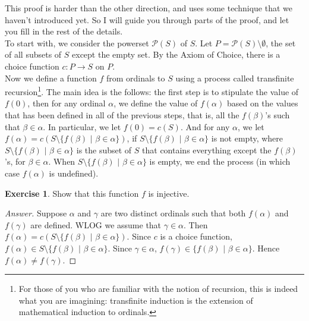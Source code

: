 \documentclass[11pt]{article}
\theoremstyle{definition}
\newtheorem{exer}{Exercise}
\begin{document}
\noindent
This proof is harder than the other direction, and uses some technique that we haven't introduced yet. So I will guide you through parts of the proof, and let you fill in the rest of the details. \\

\noindent
To start with, we consider the powerset $\mathcal{P}(S)$ of $S$. Let $P = \mathcal{P}(S) \setminus \emptyset$, the set of all subsets of $S$ except the empty set. By the Axiom of Choice, there is a choice function $c: P \rightarrow S$ on $P$. \\

\noindent
Now we define a function $f$ from ordinals to $S$ using a process called transfinite recursion\footnote{For those of you who are familiar with the notion of recursion, this is indeed what you are imagining: transfinite induction is the extension of mathematical induction to ordinals.}. The main idea is the follows: the first step is to stipulate the value of $f(0)$, then for any ordinal $\alpha$, we define the value of $f(\alpha)$ based on the values that has been defined in all of the previous steps, that is, all the $f(\beta)$'s such that $\beta \in \alpha$. In particular, we let $f(0) = c(S)$. And for any $\alpha$, we let $f(\alpha) = c(S \setminus \{f(\beta) \, \, | \, \, \beta \in \alpha \})$, if $S \setminus \{f(\beta) \, \, | \, \, \beta \in \alpha \}$ is not empty, where $S \setminus \{f(\beta) \, \, | \, \, \beta \in \alpha \}$ is the subset of $S$ that contains everything except the $f(\beta)$'s, for $\beta \in \alpha$. When $S \setminus \{f(\beta) \, \, | \, \, \beta \in \alpha \}$ is empty, we end the process (in which case $f(\alpha)$ is undefined).

\begin{exer}
Show that this function $f$ is injective.
\end{exer}

\begin{proof}[Answer]
Suppose $\alpha$ and $\gamma$ are two distinct ordinals such that both $f(\alpha)$ and $f(\gamma)$ are defined. WLOG we assume that $\gamma \in \alpha$. Then $f(\alpha) = c(S \setminus \{f(\beta) \, \, | \, \, \beta \in \alpha \})$. Since $c$ is a choice function, $f(\alpha) \in S \setminus \{f(\beta) \, \, | \, \, \beta \in \alpha \}$. Since $\gamma \in \alpha$, $f(\gamma) \in \{f(\beta) \, \, | \, \, \beta \in \alpha \}$. Hence $f(\alpha) \neq f(\gamma)$.

\end{proof}
\end{document}
